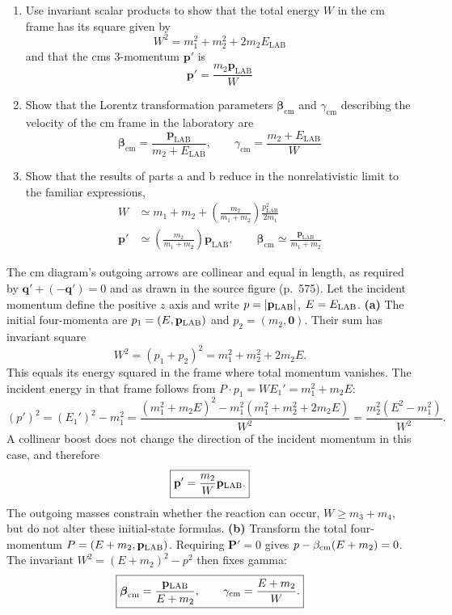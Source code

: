 \begin{enumerate}
\item[(a)] Use invariant scalar products to show that the total energy $W$ in the cm frame has its square given by
\[
W^{2}=m_{1}^{2}+m_{2}^{2}+2m_{2}E_{\mathrm{LAB}}
\]
and that the cms 3-momentum $\mathbf{p}'$ is
\[
\mathbf{p}'=\frac{m_{2}\mathbf{p}_{\mathrm{LAB}}}{W}
\]
\item[(b)] Show that the Lorentz transformation parameters $\boldsymbol{\beta}_{\mathrm{cm}}$ and $\gamma_{\mathrm{cm}}$ describing the velocity of the cm frame in the laboratory are
\[
\boldsymbol{\beta}_{\mathrm{cm}}=\frac{\mathbf{p}_{\mathrm{LAB}}}{m_{2}+E_{\mathrm{LAB}}},\qquad
\gamma_{\mathrm{cm}}=\frac{m_{2}+E_{\mathrm{LAB}}}{W}
\]
\item[(c)] Show that the results of parts a and b reduce in the nonrelativistic limit to the familiar expressions,
\begin{align*}
W&\simeq m_{1}+m_{2}+\left(\frac{m_{2}}{m_{1}+m_{2}}\right)\!\frac{p_{\mathrm{LAB}}^{2}}{2m_{1}}\\
\mathbf{p}'&\simeq\left(\frac{m_{2}}{m_{1}+m_{2}}\right)\!\mathbf{p}_{\mathrm{LAB}},\qquad
\boldsymbol{\beta}_{\mathrm{cm}}\simeq\frac{\mathbf{p}_{\mathrm{LAB}}}{m_{1}+m_{2}}
\end{align*}
\end{enumerate}
\solution
The cm diagram's outgoing arrows are collinear and equal in
length, as required by $\mathbf q'+(-\mathbf q')=0$ and as drawn
in the source figure (p.~575).  Let the incident momentum define
the positive $z$ axis and write $p=|\mathbf p_{\rm LAB}|$,
$E=E_{\rm LAB}$.
\textbf{(a)} The initial four-momenta are
$p_1=(E,\mathbf p_{\rm LAB})$ and $p_2=(m_2,\mathbf0)$.
Their sum has invariant square
\[
\boxed{W^2=(p_1+p_2)^2=m_1^2+m_2^2+2m_2E.}
\]
This equals its energy squared in the frame where total momentum
vanishes. The incident energy in that frame follows from
$P\cdot p_1=WE_1'=m_1^2+m_2E$:
\[
(p')^2=(E_1')^2-m_1^2
=\frac{(m_1^2+m_2E)^2-m_1^2(m_1^2+m_2^2+2m_2E)}{W^2}
=\frac{m_2^2(E^2-m_1^2)}{W^2}.
\]
A collinear boost does not change the direction of the incident
momentum in this case, and therefore
\[
\boxed{\mathbf p'=\frac{m_2}{W}\mathbf p_{\rm LAB}.}
\]
The outgoing masses constrain whether the reaction can occur,
$W\geq m_3+m_4$, but do not alter these initial-state formulas.
\textbf{(b)} Transform the total four-momentum
$P=(E+m_2,\mathbf p_{\rm LAB})$. Requiring
$\mathbf P'=0$ gives $p-\beta_{\rm cm}(E+m_2)=0$.
The invariant $W^2=(E+m_2)^2-p^2$ then fixes gamma:
\[
\boxed{\boldsymbol\beta_{\rm cm}=\frac{\mathbf p_{\rm LAB}}{E+m_2},
\qquad\gamma_{\rm cm}=\frac{E+m_2}{W}.}
\]
